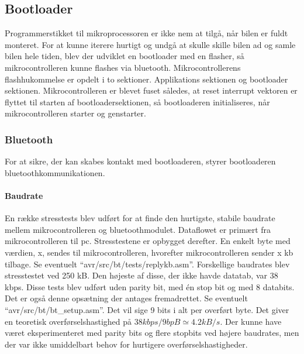 \subsection{Bootloader}
Programmerstikket til mikroprocessoren er ikke nem at tilgå, når bilen er fuldt monteret. For at kunne iterere hurtigt og undgå at skulle skille bilen ad og samle bilen hele tiden, blev der udviklet en bootloader med en flasher, så mikrocontrolleren kunne flashes via bluetooth.
Mikrocontrollerens flashhukommelse er opdelt i to sektioner. Applikations sektionen og bootloader sektionen. Mikrocontrolleren er blevet fuset således, at reset interrupt vektoren er flyttet til starten af bootloadersektionen, så bootloaderen initialiseres, når mikrocontrolleren starter og genstarter.

\subsubsection{Bluetooth}
For at sikre, der kan skabes kontakt med bootloaderen, styrer bootloaderen bluetoothkommunikationen.
\paragraph{Baudrate}
En række stresstests blev udført for at finde den hurtigste, stabile baudrate mellem mikrocontrolleren og bluetoothmodulet. Dataflowet er primært fra mikrocontrolleren til pc. Stresstestene er opbygget derefter.
En enkelt byte med værdien, x, sendes til mikrocontrolleren, hvorefter mikrocontrolleren sender x kb tilbage.
Se eventuelt \mbox{``avr/src/bt/tests/replykb.asm''}.
Forskellige baudrates blev stresstestet ved 250 kB. Den højeste af disse, der ikke havde datatab, var 38 kbps. Disse tests blev udført uden parity bit, med én stop bit og med 8 databits. Det er også denne opsætning der antages fremadrettet. Se eventuelt \mbox{``avr/src/bt/bt\_setup.asm''}. Det vil sige 9 bits i alt per overført byte. Det giver en teoretisk overførselshastighed på $38 kbps / 9 bpB \simeq 4.2 kB/s$. Der kunne have været eksperimenteret med parity bits og flere stopbits ved højere baudrates, men der var ikke umiddelbart behov for hurtigere overførselshastigheder.
